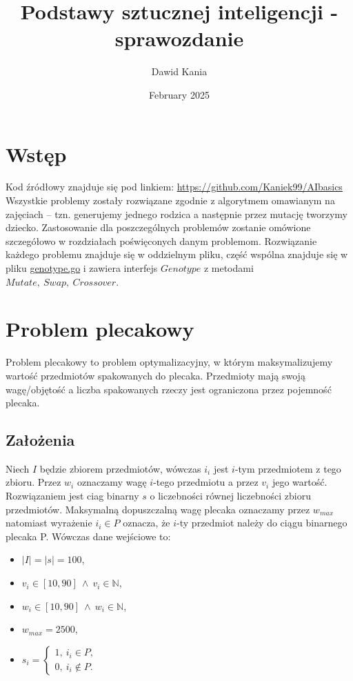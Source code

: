 \documentclass{article}
\title{Podstawy sztucznej inteligencji - sprawozdanie}
\author{Dawid Kania}
\date{February 2025}
\begin{document}
	\maketitle
	\newpage
	\section{Wstęp}
	Kod źródłowy znajduje się pod linkiem:
	\url{https://github.com/Kaniek99/AIbasics}\\ Wszystkie problemy zostały rozwiązane
	zgodnie z algorytmem omawianym na zajęciach -- tzn. generujemy jednego rodzica
	a następnie przez mutację tworzymy dziecko. Zastosowanie dla poszczególnych
	problemów zostanie omówione szczegółowo w rozdziałach poświęconych danym
	problemom. Rozwiązanie każdego problemu znajduje się w oddzielnym pliku, część
	wspólna znajduje się w pliku
	\href{https://github.com/Kaniek99/AIbasics/blob/main/src/genotype/genotype.go}{genotype.go}
	i zawiera interfejs $Genotype$ z metodami $Mutate,\ Swap,\ Crossover$.
	\section{Problem plecakowy}
	Problem plecakowy to problem optymalizacyjny, w którym maksymalizujemy wartość
	przedmiotów spakowanych do plecaka. Przedmioty mają swoją wagę/objętość a liczba
	spakowanych rzeczy jest ograniczona przez pojemność plecaka.
	\subsection{Założenia}
	Niech $I$ będzie zbiorem przedmiotów, wówczas $i_{i}$ jest $i$-tym przedmiotem
	z tego zbioru. Przez $w_{i}$ oznaczamy wagę $i$-tego przedmiotu a przez
	$v_{i}$ jego wartość. Rozwiązaniem jest ciag binarny $s$ o liczebności równej liczebności
	zbioru przedmiotów. Maksymalną dopuszczalną wagę plecaka oznaczamy przez
	$w_{max}$ natomiast wyrażenie $i_{i}\in P$ oznacza, że $i$-ty przedmiot należy
	do ciągu binarnego plecaka P. Wówczas dane wejściowe to:
	\begin{itemize}
		\item $|I| = |s| = 100$,

		\item $v_{i}\in[10,90]\ \wedge\ v_{i}\in\mathbb{N}$,

		\item $w_{i}\in[10,90]\ \wedge\ w_{i}\in\mathbb{N}$,

		\item $w_{max}= 2500$,

		\item $s_{i}=\left\{
			\begin{array}{l}
				1,\ i_i\in P,     \\
				0,\ i_i\not\in P.
			\end{array}\right.$
	\end{itemize}
\end{document}
